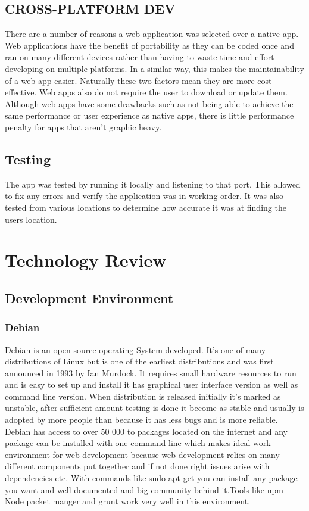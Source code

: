\begin{itemize}
\section{CROSS-PLATFORM DEV}

There are a number of reasons a web application was selected over a native app. Web applications have the benefit of portability as they can be coded once and ran on many different devices rather than having to waste time and effort developing on multiple platforms. In a similar way, this makes the maintainability of a web app easier. Naturally these two factors mean they are more cost effective. Web apps also do not require the user to download or update them. Although web apps have some drawbacks such as not being able to achieve the same performance or user experience as native apps, there is little performance penalty for apps that aren't graphic heavy. 

\section{Testing}

The app was tested by running it locally and listening to that port. This allowed to fix any errors and verify the application was in working order. It was also tested from various locations to determine how accurate it was at finding the users location.




\chapter{Technology Review}
\section{Development Environment}

\subsection{Debian}
\bigbreak
Debian is an open source operating System developed. It’s one of many distributions of Linux but is one of the earliest distributions and was first announced in 1993 by Ian Murdock. It requires small hardware resources to run and is easy to set up and install it has graphical user interface version as well as command line version. When distribution is released initially it’s marked as unstable, after sufficient amount testing is done it become as stable and usually is adopted by more people than because it has less bugs and is more reliable. Debian has access to over 50 000 to packages located on the internet and any package can be installed with one command line which makes ideal work environment for web development because web development relies on many different components put together and if not done right issues arise with dependencies etc. With commands like sudo apt-get you can install any package you want and well documented and big community behind it.Tools like npm Node packet manger and grunt work very well in this environment.
\pagebreak

\end{itemize}
